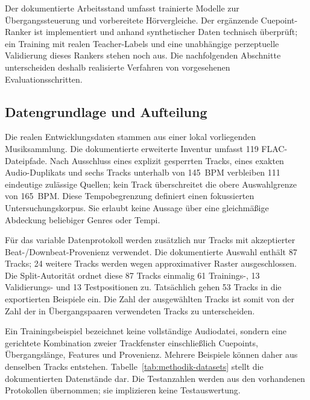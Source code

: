 Der dokumentierte Arbeitsstand umfasst trainierte Modelle zur Übergangssteuerung und vorbereitete Hörvergleiche. Der ergänzende Cuepoint-Ranker ist implementiert und anhand synthetischer Daten technisch überprüft; ein Training mit realen Teacher-Labels und eine unabhängige perzeptuelle Validierung dieses Rankers stehen noch aus. Die nachfolgenden Abschnitte unterscheiden deshalb realisierte Verfahren von vorgesehenen Evaluationsschritten.

\subsection{Datengrundlage und Aufteilung}
\label{sec:methodik-daten}

Die realen Entwicklungsdaten stammen aus einer lokal vorliegenden Musiksammlung. Die dokumentierte erweiterte Inventur umfasst 119 FLAC-Dateipfade. Nach Ausschluss eines explizit gesperrten Tracks, eines exakten Audio-Duplikats und sechs Tracks unterhalb von 145~BPM verbleiben 111 eindeutige zulässige Quellen; kein Track überschreitet die obere Auswahlgrenze von 165~BPM. Diese Tempobegrenzung definiert einen fokussierten Untersuchungskorpus. Sie erlaubt keine Aussage über eine gleichmäßige Abdeckung beliebiger Genres oder Tempi.


Für das variable Datenprotokoll werden zusätzlich nur Tracks mit akzeptierter Beat-/Downbeat-Provenienz verwendet. Die dokumentierte Auswahl enthält 87 Tracks; 24 weitere Tracks werden wegen approximativer Raster ausgeschlossen. Die Split-Autorität ordnet diese 87 Tracks einmalig 61 Trainings-, 13 Validierungs- und 13 Testpositionen zu. Tatsächlich gehen 53 Tracks in die exportierten Beispiele ein. Die Zahl der ausgewählten Tracks ist somit von der Zahl der in Übergangspaaren verwendeten Tracks zu unterscheiden.

Ein Trainingsbeispiel bezeichnet keine vollständige Audiodatei, sondern eine gerichtete Kombination zweier Trackfenster einschließlich Cuepoints, Übergangslänge, Features und Provenienz. Mehrere Beispiele können daher aus denselben Tracks entstehen. Tabelle~\ref{tab:methodik-datasets} stellt die dokumentierten Datenstände dar. Die Testanzahlen werden aus den vorhandenen Protokollen übernommen; sie implizieren keine Testauswertung.

